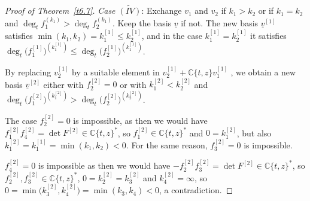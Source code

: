 \documentclass[pdftex]{sigma}%
\numberwithin{equation}{section}
\numberwithin{figure}{section}
\newcommand{\C}{{\mathbb C}}
\newcommand{\www}{\widetilde}
\newcommand{\uuuu}{\underline}
\begin{document}
\begin{proof}[Proof of Theorem~\ref{t6.7}]
\medskip\noindent
{\it Case $\www{(IV)}$}: Exchange $v_1$ and $v_2$ if
$k_1>k_2$ or if $k_1=k_2$ and
$\deg_tf_1^{(k_1)}>\deg_tf_2^{(k_1)}$.
Keep the basis $\uuuu{v}$ if not. The new basis
$\uuuu{v}^{[1]}$ satisfies
$\min(k_1,k_2)=k_1^{[1]}\leq k_2^{[1]}$, and
in the case $k_1^{[1]}=k_2^{[1]}$ it satisfies
$\deg_t \big(f_1^{[1]}\big)^{(k_1^{[1]})}\leq \deg_t \big(f_2^{[1]}\big)^{(k_1^{[1]})}$.

By replacing $v_2^{[1]}$ by a suitable element in
$v_2^{[1]}+\C\{t,z\} v_1^{[1]}$ , we obtain a new basis
$\uuuu{v}^{[2]}$ either with $f_2^{[2]}=0$ or
with $k_1^{[2]}< k_2^{[2]}$ and
$\deg_t \big(f_1^{[2]}\big)^{(k_1^{[2]})}
>\deg_t \big(f_2^{[2]}\big)^{(k_2^{[2]})}$.

The case $f_2^{[2]}=0$ is impossible, as then
we would have
$f_1^{[2]}f_4^{[2]}=\det F^{[2]}\in\C\{t,z\}^*$, so
$f_1^{[2]}\in\C\{t,z\}^*$ and
$0= k_1^{[2]}$, but also $k_1^{[2]}=k_1^{[1]}=\min(k_1,k_2)<0$.
For the same reason, $f_3^{[2]}=0$ is impossible.

$f_4^{[2]}=0$ is impossible as then we would have
$-f_2^{[2]}f_3^{[2]}=\det F^{[2]}\in \C\{t,z\}^*$,
so $f_2^{[2]},f_3^{[2]}\in\C\{t,z\}^*$,
$0=k_2^{[2]}=k_3^{[2]}$ and $k_4^{[2]}=\infty$,
so $0=\min\big(k_3^{[2]},k_4^{[2]}\big)=\min(k_3,k_4)<0$,
a contradiction.


\end{proof}
\end{document}
